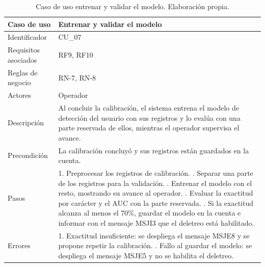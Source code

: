 \begin{table}[H]
\centering
\small
\begin{tabularx}{\textwidth}{|L{3.0cm}|Y|}
\hline
\textbf{Caso de uso} & \textbf{Entrenar y validar el modelo} \\
\hline
Identificador & CU\_07 \\
\hline
Requisitos asociados & RF9, RF10 \\
\hline
Reglas de negocio & RN-7, RN-8 \\
\hline
Actores & Operador \\
\hline
Descripción & Al concluir la calibración, el sistema entrena el modelo de detección del usuario con sus registros y lo evalúa con una parte reservada de ellos, mientras el operador supervisa el avance. \\
\hline
Precondición & La calibración concluyó y sus registros están guardados en la cuenta. \\
\hline
Pasos & 1. Preprocesar los registros de calibración. . Separar una parte de los registros para la validación. . Entrenar el modelo con el resto, mostrando su avance al operador. . Evaluar la exactitud por carácter y el AUC con la parte reservada. . Si la exactitud alcanza al menos el 70\%, guardar el modelo en la cuenta e informar con el mensaje MSJI3 que el deletreo está habilitado. \\
\hline
Errores & 1. Exactitud insuficiente: se despliega el mensaje MSJE8 y se propone repetir la calibración. . Fallo al guardar el modelo: se despliega el mensaje MSJE5 y no se habilita el deletreo. \\
\hline
\end{tabularx}
\caption{Caso de uso entrenar y validar el modelo. Elaboración propia.}
\label{tab:cu07}
\end{table}

